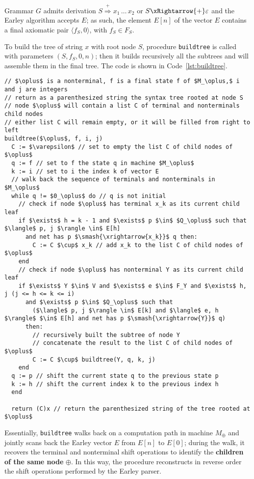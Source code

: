 Grammar \(G\) admits derivation \(S \overset{+}{\Rightarrow} x_1 \,\ldots\, x_2\) or \(S \xRightarrow{+} \varepsilon\) and the Earley algorithm accepts \(E\);
as such, the element \(E[n]\) of the vector \(E\) contains a final axiomatic pair \(\langle f_S, 0 \rangle\), with \(f_S \in F_S\).

To build the tree of string \(x\) with root node \(S\), procedure \texttt{buildtree} is called with parameters \((S, f_S, 0, n)\);
then it builds recursively all the subtrees and will assemble them in the final tree.
The code is shown in Code~\ref{lst:buildtree}.

\begin{lstlisting}[caption={\texttt{buildtree} procedure}, label={lst:buildtree}]
// $\oplus$ is a nonterminal, f is a final state f of $M_\oplus,$ i and j are integers
// return as a parenthesized string the syntax tree rooted at node S
// node $\oplus$ will contain a list C of terminal and nonterminals child nodes
// either list C will remain empty, or it will be filled from right to left
buildtree($\oplus$, f, i, j)
  C := $\varepsilon$ // set to empty the list C of child nodes of $\oplus$
  q := f // set to f the state q in machine $M_\oplus$
  k := i // set to i the index k of vector E
  // walk back the sequence of terminals and nonterminals in $M_\oplus$
  while q != $0_\oplus$ do // q is not initial
    // check if node $\oplus$ has terminal x_k as its current child leaf
    if $\exists$ h = k - 1 and $\exists$ p $\in$ $Q_\oplus$ such that $\langle$ p, j $\rangle \in$ E[h]
      and net has p $\smash{\xrightarrow{x_k}}$ q then:
        C := C $\cup$ x_k // add x_k to the list C of child nodes of $\oplus$
    end
    // check if node $\oplus$ has nonterminal Y as its current child leaf
    if $\exists$ Y $\in$ V and $\exists$ e $\in$ F_Y and $\exists$ h, j (j <= h <= k <= i)
      and $\exists$ p $\in$ $Q_\oplus$ such that
        ($\langle$ p, j $\rangle \in$ E[k] and $\langle$ e, h $\rangle$ $\in$ E[h] and net has p $\smash{\xrightarrow{Y}}$ q)
      then:
        // recursively built the subtree of node Y
        // concatenate the result to the list C of child nodes of $\oplus$
        C := C $\cup$ buildtree(Y, q, k, j)
    end
  q := p // shift the current state q to the previous state p
  k := h // shift the current index k to the previous index h
  end

  return (C)x // return the parenthesized string of the tree rooted at $\oplus$
\end{lstlisting}

Essentially, \texttt{buildtree} walks back on a computation path in machine \(M_\oplus\) and jointly scans back the Earley vector \(E\) from \(E[n]\) to \(E[0]\);
during the walk, it recovers the terminal and nonterminal shift operations to identify the \textbf{children of the same node} \(\oplus\).
In this way, the procedure reconstructs in reverse order the shift operations performed by the Earley parser.

